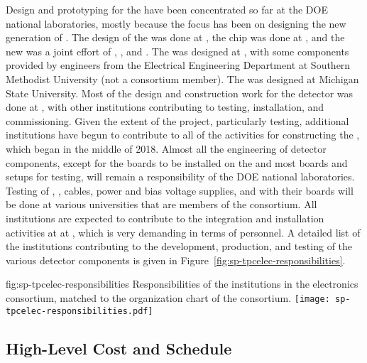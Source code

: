 Design and prototyping for the    have been 
concentrated so far at the DOE national laboratories, mostly because the 
focus has been on designing the new generation of . The design 
of the  was done at , the  
chip was done at , and the new  was a joint effort of 
, , and . The  
 was designed at , with some components 
provided by engineers from the Electrical Engineering Department
at Southern Methodist University (not a consortium member).
The  was designed at Michigan State University.
Most of the design and construction work for the  detector 
was done at , with other institutions contributing to 
testing, installation, and commissioning. Given the extent of the project, 
particularly testing, additional institutions have begun to contribute
to all of the activities for constructing the   , which began 
in the middle of 2018. Almost all the engineering of detector components, 
except for the boards to be installed on the  and most boards 
and setups for testing, will remain a responsibility
of the DOE national laboratories. Testing of 
, , cables, power and bias voltage supplies,
and  with their boards will be done at various
universities that are members of the consortium. All institutions
are expected to contribute to the integration and installation activities at
at , which is very
demanding in terms of personnel. A detailed list of the 
institutions contributing to the development, production, and
testing of the various detector components is given in Figure~\ref{fig:sp-tpcelec-responsibilities}.

\begin{dunefigure}
{fig:sp-tpcelec-responsibilities}
{Responsibilities of the institutions in the  electronics 
consortium, matched to the organization chart of the consortium.}
\texttt{[image: sp-tpcelec-responsibilities.pdf]}
\end{dunefigure}

\subsection{High-Level Cost and Schedule}
\label{sec:fdsp-tpcelec-management-cost}

